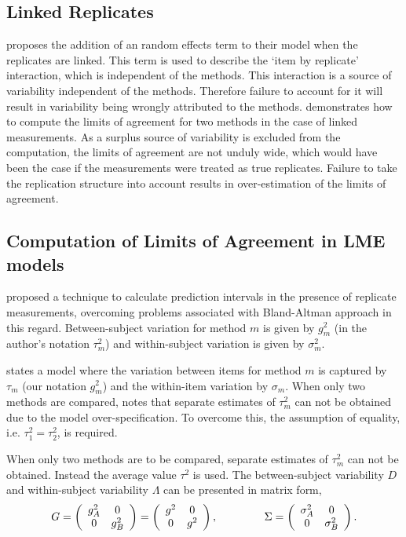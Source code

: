 \documentclass[12pt, a4paper]{report}
\theoremstyle{plain}
\theoremstyle{definition}
\theoremstyle{remark}
\begin{document}
\subsection{Linked Replicates}
	
\citet{BXC2008} proposes the addition of an random effects term to their model when the replicates are linked. This term is used to describe the `item by replicate' interaction, which is independent of the methods. This interaction is a source of variability independent of the methods. Therefore failure to account for it will result in variability being wrongly attributed to the methods. \citet{BXC2008} demonstrates how to compute the limits of agreement for two methods in the case of linked measurements. As a surplus source of variability is excluded from the computation, the limits of agreement are not unduly wide, which would have been the case if the measurements were treated as true replicates.
Failure to take the replication structure into account results in over-estimation of the limits of agreement.
	
	
	
	
	
	\subsection{Computation of Limits of Agreement in LME models}
	
	
	\citet{BXC2008} proposed a technique to calculate prediction intervals in the presence of replicate measurements, overcoming problems associated with Bland-Altman approach in this regard. Between-subject variation for method $m$ is given by $g^2_{m}$ (in the author's notation $\tau^2_m$) and within-subject variation is given by $\sigma^2_{m}$.  

	\citet{BXC2008} states a model where the variation between items for method $m$ is captured by $\tau_m$ (our notation $g^2_m$) and the within-item variation by $\sigma_m$. When only two methods are compared, \citet{BXC2008} notes that separate estimates of $\tau^2_m$ can not be obtained due to the model over-specification. To overcome this, the assumption of equality, i.e. $\tau^2_1 = \tau^2_2$, is required.
	
	When only two methods are to be compared, separate estimates of $\tau^2_m$ can not be obtained. Instead the average value $\tau^2$ is used. The between-subject variability ${D}$ and within-subject variability ${\Lambda}$ can be presented in matrix form,\[
	{G} = \left(%
	\begin{array}{cc}
	g^2_{A}& 0 \\
	0 & g^2_{B} \\
	\end{array}%
	\right)=\left(%
	\begin{array}{cc}
	g^2& 0 \\
	0 & g^2\\
	\end{array}%
	\right),
	\hspace{1.5cm}
	{\Sigma} = \left(%
	\begin{array}{cc}
	\sigma^2_{A}& 0 \\
	0 & \sigma^2_{B} \\
	\end{array}%
	\right).
	\]
	
\end{document}
